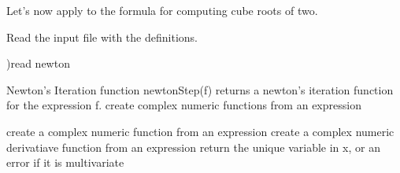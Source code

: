 Let's now apply  to the formula for computing
cube roots of two.
%
\begin{noOutputXtc}
\begin{xtccomment}
Read the input file with the definitions.
\end{xtccomment}
\begin{spadsrc}
)read newton
\end{spadsrc}
Newton's Iteration function
newtonStep(f) returns a newton's iteration function for the
expression f.
create complex numeric functions from an expression
\begin{TeXOutput}
\begin{fricasmath}{2}
%
\end{fricasmath}
\end{TeXOutput}
create a complex numeric function from an expression
create a complex numeric derivatiave function from an expression
return the unique variable in x, or an error if it is multivariate
\end{noOutputXtc}
